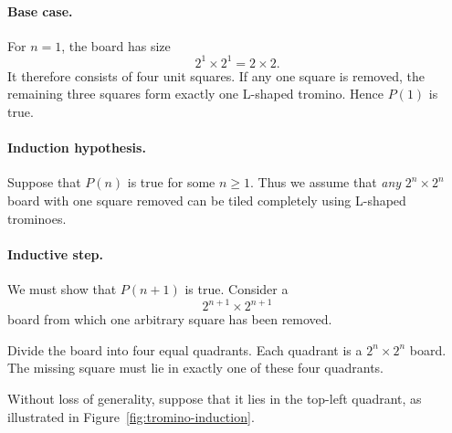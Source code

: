 \documentclass[12pt]{article}
\begin{document}
\paragraph{Base case.}

For $n=1$, the board has size
\[
        2^1\times2^1=2\times2.
\]
It therefore consists of four unit squares. If any one square is
removed, the remaining three squares form exactly one L-shaped
tromino. Hence $P(1)$ is true.


\paragraph{Induction hypothesis.}

Suppose that $P(n)$ is true for some $n\geq1$. Thus we assume that
\emph{any} $2^n\times2^n$ board with one square removed can be tiled
completely using L-shaped trominoes.


\paragraph{Inductive step.}

We must show that $P(n+1)$ is true. Consider a
\[
        2^{n+1}\times2^{n+1}
\]
board from which one arbitrary square has been removed.

Divide the board into four equal quadrants. Each quadrant is a
$2^n\times2^n$ board. The missing square must lie in exactly one of
these four quadrants.

Without loss of generality, suppose that it lies in the top-left
quadrant, as illustrated in Figure~\ref{fig:tromino-induction}.
\end{document}
